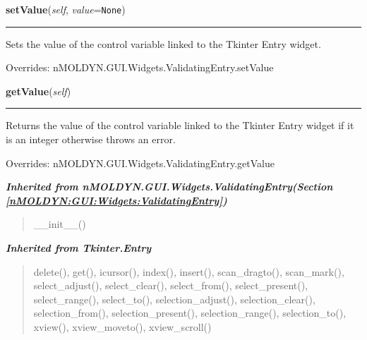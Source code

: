     \vspace{0.5ex}

\hspace{.8\funcindent}\begin{boxedminipage}{\funcwidth}

    \raggedright \textbf{setValue}(\textit{self}, \textit{value}={\tt None})

    \vspace{-1.5ex}

    \rule{\textwidth}{0.5\fboxrule}
\setlength{\parskip}{2ex}
    Sets the value of the control variable linked to the Tkinter Entry 
    widget.

\setlength{\parskip}{1ex}
      Overrides: nMOLDYN.GUI.Widgets.ValidatingEntry.setValue

    \end{boxedminipage}

    \vspace{0.5ex}

\hspace{.8\funcindent}\begin{boxedminipage}{\funcwidth}

    \raggedright \textbf{getValue}(\textit{self})

    \vspace{-1.5ex}

    \rule{\textwidth}{0.5\fboxrule}
\setlength{\parskip}{2ex}
    Returns the value of the control variable linked to the Tkinter Entry 
    widget if it is an integer otherwise throws an error.

\setlength{\parskip}{1ex}
      Overrides: nMOLDYN.GUI.Widgets.ValidatingEntry.getValue

    \end{boxedminipage}


\large{\textbf{\textit{Inherited from nMOLDYN.GUI.Widgets.ValidatingEntry\textit{(Section \ref{nMOLDYN:GUI:Widgets:ValidatingEntry})}}}}

\begin{quote}
\_\_init\_\_()
\end{quote}

\large{\textbf{\textit{Inherited from Tkinter.Entry}}}

\begin{quote}
delete(), get(), icursor(), index(), insert(), scan\_dragto(), scan\_mark(), select\_adjust(), select\_clear(), select\_from(), select\_present(), select\_range(), select\_to(), selection\_adjust(), selection\_clear(), selection\_from(), selection\_present(), selection\_range(), selection\_to(), xview(), xview\_moveto(), xview\_scroll()
\end{quote}

